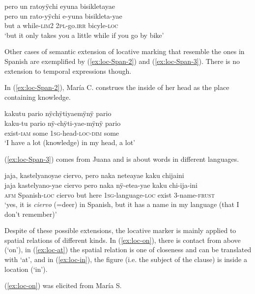 \ea\label{ex:loc-Span-1}
\begingl
\glpreamble pero un ratoyÿchi eyuna bisikletayae\\
\gla pero {un rato}-yÿchi e-yuna bisikleta-yae\\
\glb but {a while}-\textsc{lim}2 2\textsc{pl}-go.\textsc{irr} bicyle-\textsc{loc}\\
\glft ‘but it only takes you a little while if you go by bike’
\endgl
\trailingcitation{[cux-c120414ls-1.155]}
\xe

Other cases of semantic extension of locative marking that resemble the ones in Spanish are exemplified by (\ref{ex:loc-Span-2}) and (\ref{ex:loc-Span-3}). There is no extension to temporal expressions though.

In (\ref{ex:loc-Span-2}), María C. construes the inside of her head as the place containing knowledge.

\ea\label{ex:loc-Span-2}
\begingl
\glpreamble kakutu pario nÿchÿtiyaemÿnÿ pario\\
\gla kaku-tu pario nÿ-chÿti-yae-mÿnÿ pario\\
\glb exist-\textsc{iam} some 1\textsc{sg}-head-\textsc{loc}-\textsc{dim} some\\
\glft ‘I have a lot (knowledge) in my head, a lot’
\endgl
\trailingcitation{[uxx-p110825l.095]}
\xe

(\ref{ex:loc-Span-3}) comes from Juana and is about words in different languages.

\ea\label{ex:loc-Span-3}
\begingl
\glpreamble jaja, kastelyanoyae ciervo, pero naka neteayae kaku chijaini\\
\gla jaja kastelyano-yae ciervo pero naka nÿ-etea-yae kaku chi-ija-ini\\
\glb \textsc{afm} Spanish-\textsc{loc} ciervo but here 1\textsc{sg}-language-\textsc{loc} exist 3-name-\textsc{frust}\\
\glft ‘yes, it is \textit{ciervo} (=deer) in Spanish, but it has a name in my language (that I don’t remember)’
\endgl
\trailingcitation{[jxx-a120516l-a.231-233]}
\xe

Despite of these possible extensions, the locative marker is mainly applied to spatial relations of different kinds. In (\ref{ex:loc-on}), there is contact from above (‘on’), in (\ref{ex:loc-at}) the spatial relation is one of closeness and can be translated with ‘at’, and in (\ref{ex:loc-in}), the figure (i.e. the subject of the clause) is inside a location (‘in’).

(\ref{ex:loc-on}) was elicited from María S.

